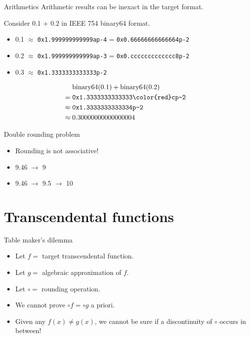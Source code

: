 \documentclass{beamer}
\begin{document}
\begin{frame}{Arithmetics}
	Arithmetic results can be inexact in the target format.

	\begin{example}
		Consider 0.1 + 0.2 in IEEE 754 binary64 format.

		\begin{itemize}
			\item 0.1 $\approx$ \texttt{0x1.999999999999ap-4} = \texttt{0x0.6666666666666{\color{red}4}p-2}
			\item 0.2 $\approx$ \texttt{0x1.999999999999ap-3} = \texttt{0x0.ccccccccccccc{\color{red}8}p-2}
			\item 0.3 $\approx$ \texttt{0x1.3333333333333p-2}
		\end{itemize}
		\begin{align*}
			& \textup{binary64}(0.1) + \textup{binary64}(0.2)
			\\ ={}& \texttt{0x1.3333333333333{\color{red}c}p-2}
			\\ \approx{}& \texttt{0x1.3333333333334p-2}
			\\ \approx{}& 0.30000000000000004
		\end{align*}
	\end{example}
\end{frame}

\begin{frame}{Double rounding problem}
	\begin{itemize}
		\item Rounding is not associative!
		\item 9.46 $\to$ 9
		\item 9.46 $\to$ 9.5 $\to$ 10
	\end{itemize}
\end{frame}

\section{Transcendental functions}
\begin{frame}{Table maker's dilemma}
	\begin{itemize}
		\item Let $f =$ target transcendental function.
		\item Let $g =$ algebraic approximation of $f$.
		\item Let $\circ =$ rounding operation.
		\item We cannot prove $\circ f = \circ g$ a priori.
		\item Given any $f \left( x \right) \ne g \left( x \right)$, we cannot
		      be sure if a discontinuity of $\circ$ occurs in between!
	\end{itemize}
\end{frame}
\end{document}
